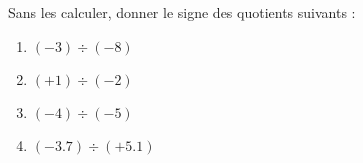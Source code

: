 
\begin{exercice}\label{exosmath-0751}

Sans les calculer, donner le signe des quotients suivants :
\begin{multicols}{2}
    \begin{enumerate}
        \item
            \( (-3)\div(-8) \)
        \item
            \( (+1)\div (-2)\)
        \item
            \( (-4)\div (-5)\)
        \item
            \( (-3.7)\div (+5.1)\)
    \end{enumerate}
\end{multicols}

\end{exercice}
